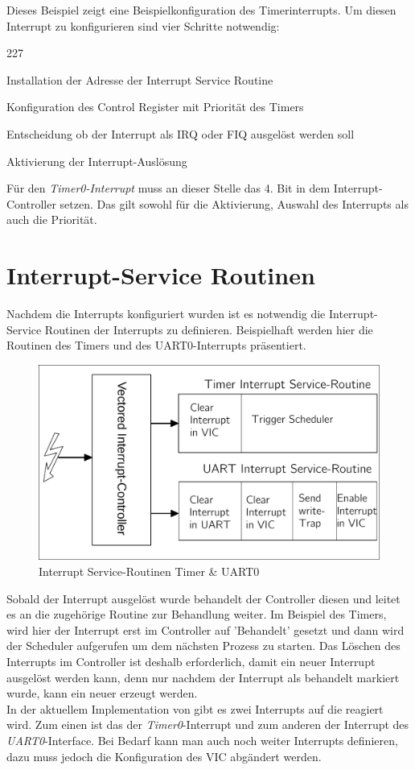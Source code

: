 \noindent
Dieses Beispiel zeigt eine Beispielkonfiguration des Timerinterrupts. Um diesen Interrupt zu konfigurieren sind vier Schritte notwendig:
\begin{dinglist}{227}
	\item{Installation der Adresse der Interrupt Service Routine}
	\item{Konfiguration des Control Register mit Priorit\"at des Timers}
	\item{Entscheidung ob der Interrupt als IRQ oder FIQ ausgel\"ost werden soll}
	\item{Aktivierung der Interrupt-Ausl\"osung}
\end{dinglist}
F\"ur den \textit{Timer0-Interrupt} muss an dieser Stelle das 4. Bit \parencite[vgl. Tabelle 4-40][227]{archManI} in dem Interrupt-Controller setzen. Das gilt sowohl f\"ur die Aktivierung, Auswahl des Interrupts als auch die Priorit\"at.

\section{Interrupt-Service Routinen}
Nachdem die Interrupts konfiguriert wurden ist es notwendig die Interrupt-Service Routinen der Interrupts zu definieren. Beispielhaft werden hier die Routinen des Timers und des UART0-Interrupts pr\"asentiert.
\begin{figure}[H]
	\begin{center}	
	\caption{Interrupt Service-Routinen Timer \& UART0}
	\includegraphics[scale=0.60]{common/isr.pdf}
	\end{center}
\end{figure}
\noindent
Sobald der Interrupt ausgel\"ost wurde behandelt der Controller diesen und leitet es an die zugeh\"orige Routine zur Behandlung weiter. Im Beispiel des Timers, wird hier der Interrupt erst im Controller auf 'Behandelt' gesetzt und dann wird der Scheduler aufgerufen um dem n\"achsten Prozess zu starten. Das L\"oschen des Interrupts im Controller ist deshalb erforderlich, damit ein neuer Interrupt ausgel\"ost werden kann, denn nur nachdem der Interrupt als behandelt markiert wurde, kann ein neuer erzeugt werden. \\ In der aktuellem Implementation von \mops gibt es zwei Interrupts auf die reagiert wird. Zum einen ist das der \textit{Timer0}-Interrupt und zum anderen der Interrupt des \textit{UART0}-Interface. Bei Bedarf kann man auch noch weiter Interrupts definieren, dazu muss jedoch die Konfiguration des VIC abg\"andert werden.
\newpage
